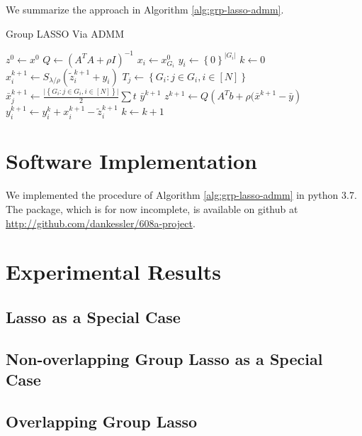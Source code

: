 \documentclass{article}
\begin{document}
We summarize the approach in Algorithm \ref{alg:grp-lasso-admm}.
\begin{algorithm}
    \caption{Group LASSO Via ADMM}
    \label{alg:grp-lasso-admm}
    \begin{algorithmic}[1]
      \State $z^0 \gets x^0$
      \State $Q \gets (A^TA + \rho I)^{-1}$
      \State $x_i \gets x^0_{G_i}$
      \State $y_i \gets \left\{ 0 \right\}^{\lvert G_i \rvert}$
      \EndFor
      \State $k \gets 0$ 
      \State $x_i^{k+1} \gets S_{\lambda/\rho}(\tilde{z}_i^{k+1} + y_i)$
      \EndFor
      \State $T_j \gets \left\{ G_i: j \in G_i, i \in [N] \right\}$
      \State $\bar{x}_j^{k+1} \gets \frac{\lvert \left\{ G_i : j \in G_i, i \in [N] \right\} \rvert}{2} \sum t $ %
      \EndFor
      \State $\bar{y}^{k+1}$ %
      \State $z^{k+1} \gets Q \left( A^Tb + \rho(\bar{x}^{k+1} - \bar{y} \right)$
      \State $y_i^{k+1} \gets y_i^k + x_i^{k+1} - \tilde{z}_i^{k+1} $
      \EndFor
      \State $k \gets k+1$
      \EndWhile
  \end{algorithmic}
\end{algorithm}

\section{Software Implementation}
\label{sec:implementation}
We implemented the procedure of Algorithm \ref{alg:grp-lasso-admm} in python 3.7.
The package, which is for now incomplete, is available on github at \url{http://github.com/dankessler/608a-project}.

\section{Experimental Results}
\label{sec:experimental-results}

\subsection{Lasso as a Special Case}
\label{sec:lasso-as-special}

\subsection{Non-overlapping Group Lasso as a Special Case}
\label{sec:non-overl-group}

\subsection{Overlapping Group Lasso}
\label{sec:overl-group-lasso}


\printbibliography
\end{document}
